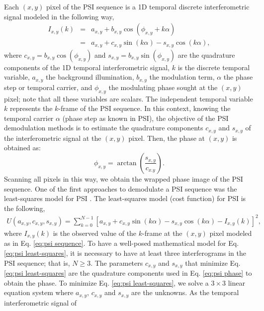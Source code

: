 Each $(x,y)$ pixel of the PSI sequence is a 1D temporal discrete
interferometric signal modeled in the following way,
\begin{eqnarray}
  I_{x,y}(k) &=& a_{x,y} + b_{x,y}\cos(\phi_{x,y} +k\alpha) \nonumber \\
  &=& a_{x,y} + c_{x,y}\sin(k\alpha) - s_{x,y}\cos(k\alpha),
  \label{eq:psi sequence}
\end{eqnarray}
where $c_{x,y}=b_{x,y}\cos(\phi_{x,y})$ and
$s_{x,y}=b_{x,y}\sin(\phi_{x,y})$ are the quadrature components of the
1D temporal interferometric signal, $k$ is the discrete temporal
variable, $a_{x,y}$ the background illumination, $b_{x,y}$ the
modulation term, $\alpha$ the phase step or temporal carrier, and
$\phi_{x,y}$ the modulating phase sought at the $(x,y)$ pixel; note that
all these variables are scalars. The independent temporal variable $k$
represents the $k$-frame of the PSI sequence. In this context, knowing
the temporal carrier $\alpha$ (phase step as known in PSI), the
objective of the PSI demodulation methods is to estimate the
quadrature components $c_{x,y}$ and $s_{x,y}$ of the interferometric
signal at the $(x,y)$ pixel. Then, the phase at $(x,y)$ is obtained as:
\begin{equation}
  \phi_{x,y}=\arctan\left(\frac{s_{x,y}}{c_{x.y}}\right).
  \label{eq:psi phase}
\end{equation}
Scanning all pixels in this way, we obtain the wrapped phase image of
the PSI sequence. One of the first approaches to demodulate a PSI
sequence was the least-squares model for PSI
\cite{Morgan,Greivenkamp,Okada,Kong}. The least-squares model (cost function) 
for PSI is the following,
\begin{align}
  U(a_{x,y},c_{x,y},s_{x,y})= \sum_{k=0}^{N-1}\left[a_{x,y} + 
  c_{x,y}\sin(k\alpha)\right.
  -\left. s_{x,y}\cos(k\alpha)-I_{x,y}(k) \right]^2,
  \label{eq:psi least-squares}
\end{align}
where $I_{x,y}(k)$ is the observed value of the $k$-frame at the
$(x,y)$ pixel modeled as in Eq. \eqref{eq:psi sequence}. To have a
well-posed mathematical model for Eq. \eqref{eq:psi least-squares},
it is necessary to have at least three interferograms in the PSI sequence;
that is, $N\geq 3$. The parameters $c_{x,y}$ and $s_{x,y}$ that
minimize Eq. \eqref{eq:psi least-squares} are the quadrature
components used in Eq. \eqref{eq:psi phase} to obtain the
phase. To minimize Eq. \eqref{eq:psi least-squares}, we solve a $3\times 3$
linear equation system where $a_{x,y}$, $c_{x,y}$ and
$s_{x,y}$ are the unknowns. As the temporal interferometric signal of
